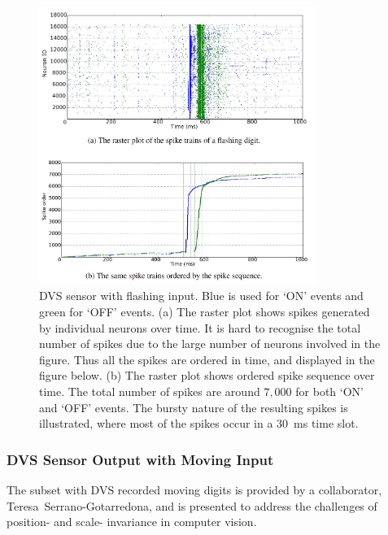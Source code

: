 \begin{figure}[tbh!]
	\centering
	\includegraphics[width=0.8\textwidth]{pics_bench/fig5.jpg}	
	\caption{DVS sensor with flashing input.
		Blue is used for `ON' events and green for `OFF' events.
		(a) The raster plot shows spikes generated by individual neurons over time.
		It is hard to recognise the total number of spikes due to the large number of neurons involved in the figure.
		Thus all the spikes are ordered in time, and displayed in the figure below.
		(b) The raster plot shows ordered spike sequence over time.
		The total number of spikes are around $7,000$ for both `ON' and `OFF' events.
		The bursty nature of the resulting spikes is illustrated, where most of the spikes occur in a 30~ms time slot.}
	\label{fig:flash}
\end{figure}

\subsubsection{DVS Sensor Output with Moving Input}

The subset with DVS recorded moving digits is provided by a collaborator, Teresa~Serrano-Gotarredona, and is  presented to address the challenges of position- and scale- invariance in computer vision.

